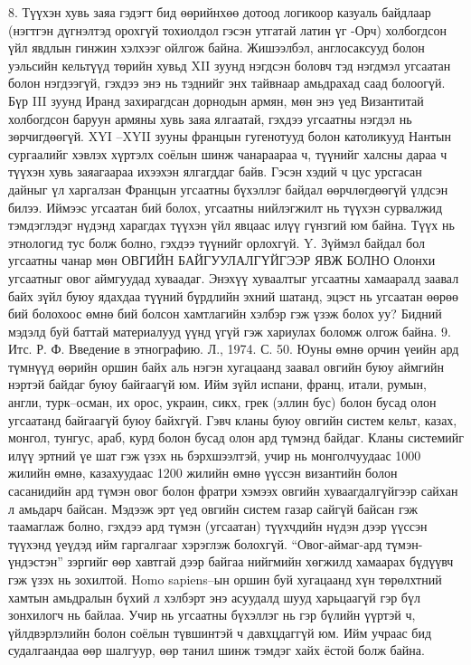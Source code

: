 8. Түүхэн хувь заяа гэдэгт бид өөрийнхөө дотоод логикоор казуаль байдлаар (нэгтгэн дүгнэлтэд орохгүй тохиолдол гэсэн утгатай латин үг -Орч) холбогдсон үйл явдлын гинжин хэлхээг ойлгож байна.
Жишээлбэл, англосаксууд болон уэльсийн кельтүүд төрийн хувьд XII зуунд нэгдсэн боловч тэд нэгдмэл угсаатан болон нэгдээгүй, гэхдээ энэ нь тэднийг энх тайвнаар амьдрахад саад болоогүй. Бүр III зуунд Иранд захирагдсан дорнодын армян, мөн энэ үед Византитай холбогдсон баруун армяны хувь заяа ялгаатай, гэхдээ угсаатны нэгдэл нь зөрчигдөөгүй. XYI –XYII зууны францын гугенотууд болон католикууд Нантын сургаалийг хэвлэх хүртэлх соёлын шинж чанараараа ч, түүнийг халсны дараа ч түүхэн хувь заяагаараа ихээхэн ялгагддаг байв. Гэсэн хэдий ч цус урсгасан дайныг үл харгалзан Францын угсаатны бүхэллэг байдал өөрчлөгдөөгүй үлдсэн билээ. Иймээс угсаатан бий болох, угсаатны нийлэгжилт нь түүхэн сурвалжид тэмдэглэдэг нүдэнд харагдах түүхэн үйл явцаас илүү гүнзгий юм байна. Түүх нь этнологид тус болж болно, гэхдээ түүнийг орлохгүй.
Y. Зүймэл байдал бол угсаатны чанар мөн
ОВГИЙН БАЙГУУЛАЛГҮЙГЭЭР ЯВЖ БОЛНО
Олонхи угсаатныг овог аймгуудад хуваадаг. Энэхүү хуваалтыг угсаатны хамааралд заавал байх зүйл буюу ядахдаа түүний бүрдлийн эхний шатанд, эцэст нь угсаатан өөрөө бий болохоос өмнө бий болсон хамтлагийн хэлбэр гэж үзэж болох уу? Бидний мэдэлд буй баттай материалууд үүнд үгүй гэж хариулах боломж олгож байна. 9. Итс. Р. Ф. Введение в этнографию. Л., 1974. С. 50.
Юуны өмнө орчин үеийн ард түмнүүд өөрийн оршин байх аль нэгэн хугацаанд заавал овгийн буюу аймгийн нэртэй байдаг буюу байгаагүй юм. Ийм зүйл испани, франц, итали, румын, англи, турк–осман, их орос, украин, сикх, грек (эллин бус) болон бусад олон угсаатанд байгаагүй буюу байхгүй. Гэвч кланы буюу овгийн систем кельт, казах, монгол, тунгус, араб, курд болон бусад олон ард түмэнд байдаг.
Кланы системийг илүү эртний үе шат гэж үзэх нь бэрхшээлтэй, учир нь монголчуудаас 1000 жилийн өмнө, казахуудаас 1200 жилийн өмнө үүссэн византийн болон сасанидийн ард түмэн овог болон фратри хэмээх овгийн хуваагдалгүйгээр сайхан л амьдарч байсан. Мэдээж эрт үед овгийн систем газар сайгүй байсан гэж таамаглаж болно, гэхдээ ард түмэн (угсаатан) түүхчдийн нүдэн дээр үүссэн түүхэнд үеүдэд ийм гаргалгааг хэрэглэж болохгүй. “Овог-аймаг-ард түмэн-үндэстэн” зэргийг өөр хавтгай дээр байгаа нийгмийн хөгжилд хамаарах бүдүүвч гэж үзэх нь зохилтой. Homo sapiens–ын оршин буй хугацаанд хүн төрөлхтний хамтын амьдралын бүхий л хэлбэрт энэ асуудалд шууд харьцаагүй гэр бүл зонхилогч нь байлаа. Учир нь угсаатны бүхэллэг нь гэр бүлийн үүртэй ч, үйлдвэрлэлийн болон соёлын түвшинтэй ч давхцдаггүй юм. Ийм учраас бид судалгаандаа өөр шалгуур, өөр танил шинж тэмдэг хайх ёстой болж байна.
